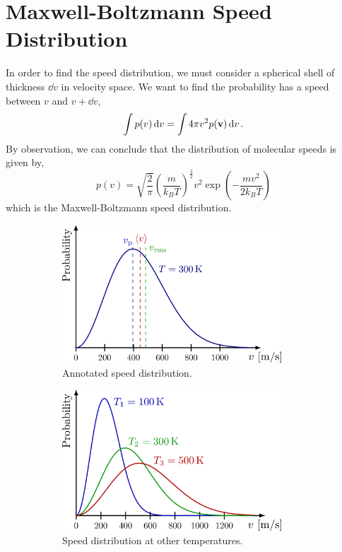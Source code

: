 \documentclass{book}
\begin{document}
\section{Maxwell-Boltzmann Speed Distribution}
In order to find the speed distribution, we must consider a spherical shell of thickness $\dd{v}$ in velocity space. We want to find the probability has a speed between $v$ and $v + \dd{v}$,
\begin{equation}
	\int p(v) \dd{v} = \int 4\pi v^2 p(\vb{v})\dd{v}.
\end{equation}
By observation, we can conclude that the distribution of molecular speeds is given by,
\begin{equation}
	\boxed{p(v) = \sqrt{\frac{2}{\pi}}}\left(\frac{m}{k_BT}\right)^{\frac{3}{2}}v^2\exp\left(-\frac{mv^2}{2k_BT}\right)
\end{equation}
which is the Maxwell-Boltzmann speed distribution.
\begin{figure}[t]
	\centering
	\begin{subfigure}{0.4\textwidth}
	\centering
	\includegraphics[width=0.9\textwidth]{maxwell-boltzmann-001.png}
	\caption{Annotated speed distribution.}
	\label{fig:maxwell boltzmann}
	\end{subfigure}
	\begin{subfigure}{0.4\textwidth}
		\centering
		\includegraphics[width=0.9\textwidth]{maxwell-boltzmann-002.png}
		\caption{Speed distribution at other temperatures.}
		\label{fig:maxwell boltzmann 2}
	\end{subfigure}
	\caption{}
\end{figure}
\end{document}
